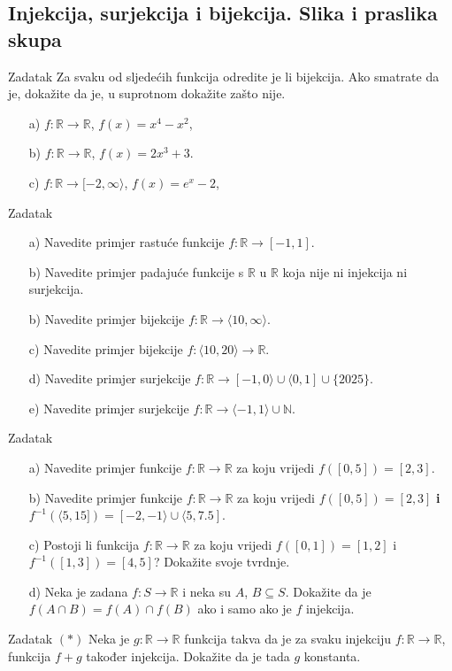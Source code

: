 \subsection*{Injekcija, surjekcija i bijekcija. Slika i praslika skupa}
\begin{exercise}{Zadatak}
Za svaku od sljedećih funkcija odredite je li bijekcija. Ako smatrate da je, dokažite da je, u suprotnom dokažite zašto nije.
\begin{itemize}
\item[a)] \(f : \mathbb{R}\to \mathbb{R}\), \(f(x)=x^4-x^2\),
\item[b)] \(f : \mathbb{R}\to \mathbb{R}\), \(f(x)=2x^3+3\).
\item[c)] \(f : \mathbb{R}\to [-2, \infty\rangle\), \(f(x)=e^x-2\),
\end{itemize}
\end{exercise}
\newpage
\begin{exercise}{Zadatak} \textbf{}
\begin{itemize}
\item[a)] Navedite primjer rastuće funkcije \(f : \mathbb{R}\to [-1, 1]\).
\item[b)] Navedite primjer padajuće funkcije s \(\mathbb{R}\) u \(\mathbb{R}\) koja nije ni injekcija ni surjekcija.
\item[b)] Navedite primjer bijekcije \(f : \mathbb{R}\to \langle 10, \infty\rangle\).
\item[c)] Navedite primjer bijekcije \(f : \langle 10, 20\rangle\to \mathbb{R}\).
\item[d)] Navedite primjer surjekcije \(f : \mathbb{R}\to [-1, 0\rangle\cup \langle 0, 1]\cup \{2025\}\).
\item[e)] Navedite primjer surjekcije \(f : \mathbb{R}\to \langle -1, 1\rangle \cup \mathbb{N}\).
\end{itemize}
\end{exercise}
\begin{exercise}{Zadatak} \textbf{}
\begin{itemize}
\item[a)] Navedite primjer funkcije \(f : \mathbb{R}\to \mathbb{R}\) za koju vrijedi \(f([0, 5])=[2, 3]\).
\item[b)] Navedite primjer funkcije \(f : \mathbb{R}\to \mathbb{R}\) za koju vrijedi \(f([0, 5])=[2, 3]\) \textbf{i} \(f^{-1}\left(\langle 5, 15]\right)=[-2, -1\rangle \cup \langle 5, 7.5]\).
\item[c)] Postoji li funkcija \(f : \mathbb{R}\to \mathbb{R}\) za koju vrijedi \(f\left([0, 1]\right)=[1, 2]\) i \(f^{-1}\left([1, 3]\right)=[4, 5]\)? Dokažite svoje tvrdnje.
\item[d)] Neka je zadana \(f : S\to \mathbb{R}\) i neka su \(A\), \(B\subseteq S\). Dokažite da je \(f(A\cap B)=f(A)\cap f(B)\) ako i samo ako je \(f\) injekcija.
\end{itemize}
\end{exercise}
\begin{exercise}{Zadatak} \((*)\) Neka je \(g : \mathbb{R}\to \mathbb{R}\) funkcija takva da je za svaku injekciju \(f : \mathbb{R}\to \mathbb{R}\), funkcija \(f+g\) također injekcija. Dokažite da je tada \(g\) konstanta.
\end{exercise}
